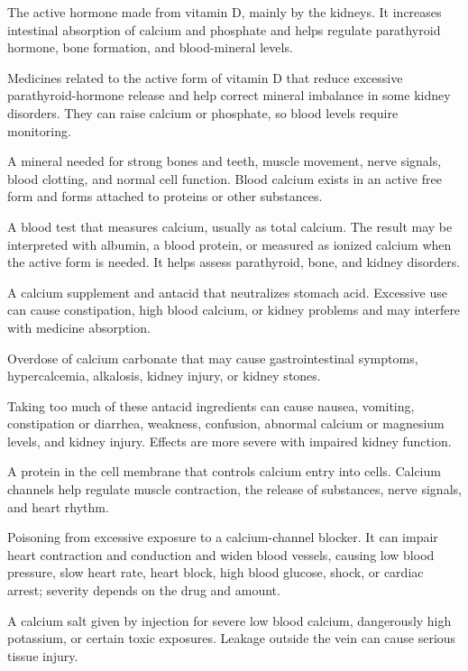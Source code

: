  The active hormone made from vitamin D, mainly by the kidneys. It increases intestinal absorption of calcium and phosphate and helps regulate parathyroid hormone, bone formation, and blood-mineral levels.

 Medicines related to the active form of vitamin D that reduce excessive parathyroid-hormone release and help correct mineral imbalance in some kidney disorders. They can raise calcium or phosphate, so blood levels require monitoring.

 A mineral needed for strong bones and teeth, muscle movement, nerve signals, blood clotting, and normal cell function. Blood calcium exists in an active free form and forms attached to proteins or other substances.

 A blood test that measures calcium, usually as total calcium. The result may be interpreted with albumin, a blood protein, or measured as ionized calcium when the active form is needed. It helps assess parathyroid, bone, and kidney disorders.

 A calcium supplement and antacid that neutralizes stomach acid. Excessive use can cause constipation, high blood calcium, or kidney problems and may interfere with medicine absorption.

 Overdose of calcium carbonate that may cause gastrointestinal symptoms, hypercalcemia, alkalosis, kidney injury, or kidney stones.

 Taking too much of these antacid ingredients can cause nausea, vomiting, constipation or diarrhea, weakness, confusion, abnormal calcium or magnesium levels, and kidney injury. Effects are more severe with impaired kidney function.

 A protein in the cell membrane that controls calcium entry into cells. Calcium channels help regulate muscle contraction, the release of substances, nerve signals, and heart rhythm.

 Poisoning from excessive exposure to a calcium-channel blocker. It can impair heart contraction and conduction and widen blood vessels, causing low blood pressure, slow heart rate, heart block, high blood glucose, shock, or cardiac arrest; severity depends on the drug and amount.

 A calcium salt given by injection for severe low blood calcium, dangerously high potassium, or certain toxic exposures. Leakage outside the vein can cause serious tissue injury.


